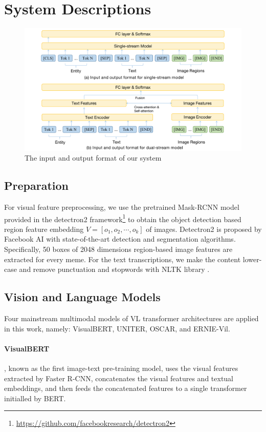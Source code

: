 \documentclass[11pt]{article}
\begin{document}
\section{System Descriptions}

\begin{figure}[h]
\centering
\includegraphics[width=\textwidth]{V.pdf}
\caption{\label{VCR}The input and output format of our system}
\end{figure}


\subsection{Preparation}


For visual feature preprocessing, we use the pretrained Mask-RCNN model provided in the detectron2 framework\footnote{\url{https://github.com/facebookresearch/detectron2}} to obtain the object detection based region feature embedding $V = [o_1, o_2, \cdots , o_k]$ of images. Detectron2 is proposed by Facebook AI with state-of-the-art detection and segmentation algorithms. Specifically, 50 boxes of 2048 dimensions region-based image features are extracted for every meme. For the text transcriptions, we make the content lower-case and remove punctuation and stopwords with NLTK library \citep{loper2002nltk}.



\subsection{Vision and Language Models}

Four mainstream multimodal models of VL transformer architectures are applied in this work, namely: VisualBERT, UNITER, OSCAR, and ERNIE-Vil. 

\paragraph{VisualBERT} \citep{li2019visualbert}, known as the first image-text pre-training model, uses the visual features extracted by Faster R-CNN, concatenates the visual features and textual embeddings, and then feeds the concatenated features to a single transformer initialled by BERT.
\end{document}
